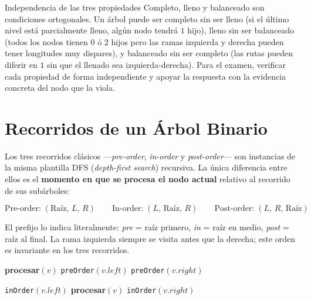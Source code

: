 \begin{observacion}{Independencia de las tres propiedades}
Completo, lleno y balanceado son condiciones ortogonales. Un árbol puede ser completo sin
ser lleno (si el último nivel está parcialmente lleno, algún nodo tendrá $1$ hijo),
lleno sin ser balanceado (todos los nodos tienen $0$ ó $2$ hijos pero las ramas izquierda
y derecha pueden tener longitudes muy dispares), y balanceado sin ser completo (las rutas
pueden diferir en $1$ sin que el llenado sea izquierda-derecha). Para el examen, verificar
cada propiedad de forma independiente y apoyar la respuesta con la evidencia concreta
del nodo que la viola.
\end{observacion}

\section{Recorridos de un Árbol Binario}
\label{sec:traversals}

Los tres recorridos clásicos —\textit{pre-order}, \textit{in-order} y \textit{post-order}—
son instancias de la misma plantilla DFS (\textit{depth-first search}) recursiva. La única
diferencia entre ellos es el \textbf{momento en que se procesa el nodo actual} relativo al
recorrido de sus subárboles:

\[
\text{Pre-order:}\;(\mathrm{Raíz},\, L,\, R)
\qquad
\text{In-order:}\;(L,\, \mathrm{Raíz},\, R)
\qquad
\text{Post-order:}\;(L,\, R,\, \mathrm{Raíz})
\]

El prefijo lo indica literalmente: \textit{pre} = raíz primero, \textit{in} = raíz en medio,
\textit{post} = raíz al final. La rama izquierda siempre se visita antes que la derecha;
este orden es invariante en los tres recorridos.

\begin{algorithm}[H]
\caption{Pre-order — (\textit{Raíz, Izquierda, Derecha})}
\label{alg:preorder}
\textbf{procesar}$(v)$\;
\texttt{preOrder}$(v.\mathit{left})$\;
\texttt{preOrder}$(v.\mathit{right})$\;
\end{algorithm}

\begin{algorithm}[H]
\caption{In-order — (\textit{Izquierda, Raíz, Derecha})}
\label{alg:inorder}
\texttt{inOrder}$(v.\mathit{left})$\;
\textbf{procesar}$(v)$\;
\texttt{inOrder}$(v.\mathit{right})$\;
\end{algorithm}

